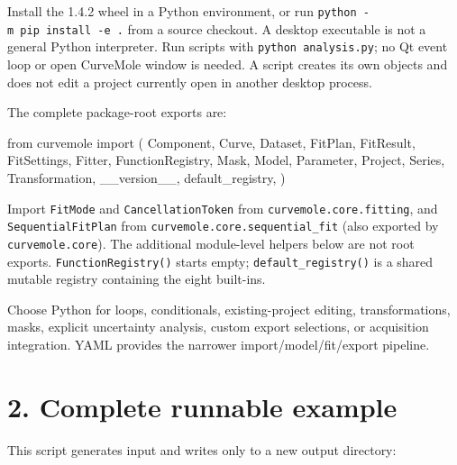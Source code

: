 \documentclass[
  10pt,
  a4paper,
  oneside]{scrreprt}
\newenvironment{Shaded}{}{}
\newcommand{\ImportTok}[1]{#1}
\newcommand{\NormalTok}[1]{#1}
\begin{document}
Install the 1.4.2 wheel in a Python environment, or run
\texttt{python\ -m\ pip\ install\ -e\ .} from a source checkout. A
desktop executable is not a general Python interpreter. Run scripts with
\texttt{python\ analysis.py}; no Qt event loop or open CurveMole window
is needed. A script creates its own objects and does not edit a project
currently open in another desktop process.

The complete package-root exports are:

\begin{Shaded}
\begin{Highlighting}[]
\ImportTok{from}\NormalTok{ curvemole }\ImportTok{import}\NormalTok{ (}
\NormalTok{    Component, Curve, Dataset, FitPlan, FitResult, FitSettings, Fitter,}
\NormalTok{    FunctionRegistry, Mask, Model, Parameter, Project, Series, Transformation,}
\NormalTok{    \_\_version\_\_, default\_registry,}
\NormalTok{)}
\end{Highlighting}
\end{Shaded}

Import \texttt{FitMode} and \texttt{CancellationToken} from
\texttt{curvemole.core.fitting}, and \texttt{SequentialFitPlan} from
\texttt{curvemole.core.sequential\_fit} (also exported by
\texttt{curvemole.core}). The additional module-level helpers below are
not root exports. \texttt{FunctionRegistry()} starts empty;
\texttt{default\_registry()} is a shared mutable registry containing the
eight built-ins.

Choose Python for loops, conditionals, existing-project editing,
transformations, masks, explicit uncertainty analysis, custom export
selections, or acquisition integration. YAML provides the narrower
import/model/fit/export pipeline.

\hypertarget{complete-runnable-example}{%
\section{2. Complete runnable example}\label{complete-runnable-example}}

This script generates input and writes only to a new output directory:
\end{document}
